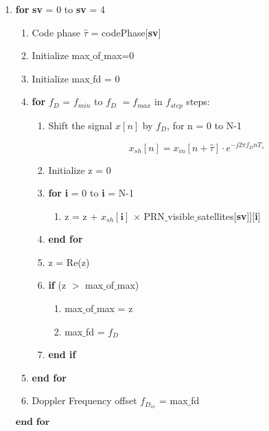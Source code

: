 \documentclass[journal,10pt,onecolumn]{article}
\begin{document}
\begin{enumerate}
    \item[]  \textbf{for} \textbf{sv} = 0  to \textbf{sv} = 4
    \begin{enumerate}
        \item[] Code phase $\hat{\tau}$ = codePhase[\textbf{sv}]
            \item[] Initialize max$\_$of$\_$max=0
            \item[] Initialize max$\_$fd    = 0
            \item[] \textbf{for} \textbf{$f_D$} = $f_{min}$ to \textbf{$f_D$} $= f_{max}$ in $f_{step}$ steps:
            \begin{enumerate}
                \item[] Shift the signal $x[n]$ by $f_D$, for n = 0 to N-1
                
                \begin{equation}
                    x_{sh}[n] = x_{in}[n+\hat{\tau}]\cdot e ^{-j 2 \pi f_D n T_s} 
                \end{equation}
                
                \item[] Initialize z = 0
                \item[] \textbf{for} \textbf{i} = 0 to \textbf{i} = N-1
                \begin{enumerate}
                    \item[] z = z + $x_{sh}[\textbf{i}]$ $\times$ PRN$\_$visible$\_$satellites[\textbf{sv}]][\textbf{i}] 
                \end{enumerate}
                \item[] \textbf{end for}
                \item[] z = Re(z)
            \item[] \textbf{if}  (z $>$ max$\_$of$\_$max)
            \begin{enumerate} 
                \item[]  max$\_$of$\_$max = z
                \item[] max$\_$fd    = \textbf{$f_D$}
            \end{enumerate}
            \item[] \textbf{end if}
            
        \end{enumerate}
        \item[] \textbf{end for}
        \item[]Doppler Frequency offset $f_{D_{sv}}$ = max$\_$fd
    \end{enumerate}
    $\textbf{end for}$
\end{enumerate}    
\end{document}
